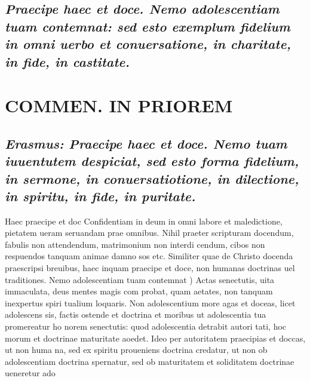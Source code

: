 \documentclass{article}
\begin{document}
\begin{pages}
\subsection*{\textit{Praecipe haec et doce. Nemo adolescentiam tuam contemnat: sed esto exemplum fidelium in omni uerbo et conuersatione, in charitate, in fide, in castitate. }}
\section*{COMMEN. IN PRIOREM }
\marginpar{[ p.108 ]}
{}
\subsection*{\textit{Erasmus: Praecipe haec et doce. Nemo tuam iuuentutem despiciat, sed esto forma fidelium, in sermone, in conuersatiotione, in dilectione, in spiritu, in fide, in puritate. }}\pstart Haec praecipe et doc Confidentiam in deum in omni labore et maledictione, pietatem ueram seruandam prae omnibus. Nihil praeter scripturam docendum, fabulis non attendendum, matrimonium non interdi cendum, cibos non respuendos tanquam animae damno sos etc. Similiter quae de Christo docenda praescripsi breuibus, haec inquam praecipe et doce, non humanas doctrinas uel traditiones.  \pend\pstart Nemo adolescentiam tuam contemnat ) Actas senectutis, uita immaculata, deus mentes magis com probat, quam aetates, non tanquam inexpertus spiri tualium loquaris. Non adolescentium more agas et doceas, licet adolescens sis, factis ostende et doctrina et moribus ut adolescentia tua promereatur ho norem senectutis: quod adolescentia detrabit autori tati, hoc morum et doctrinae maturitate aoedet. Ideo per autoritatem praecipias et doccas, ut non huma na, sed ex spiritu proueniens doctrina credatur, ut non ob adolescentiam doctrina spernatur, sed ob maturitatem et soliditatem doctrinae ueneretur ado  \pend

\end{pages}
\end{document}
